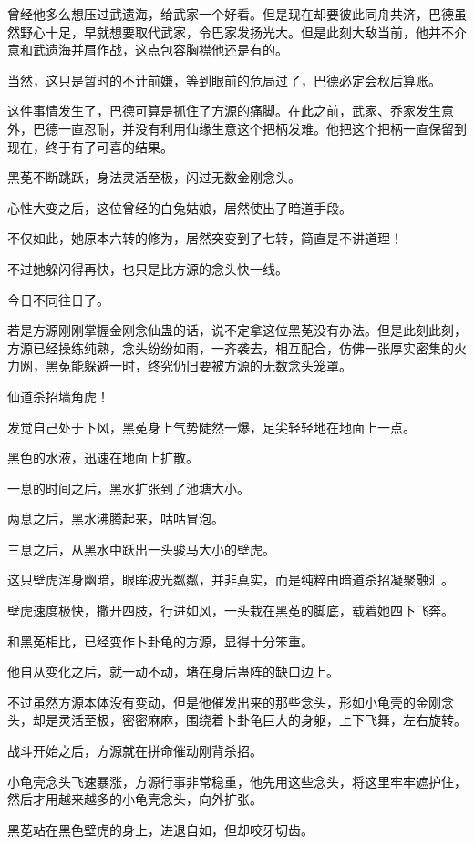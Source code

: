 \begin{this_body}
曾经他多么想压过武遗海，给武家一个好看。但是现在却要彼此同舟共济，巴德虽然野心十足，早就想要取代武家，令巴家发扬光大。但是此刻大敌当前，他并不介意和武遗海并肩作战，这点包容胸襟他还是有的。

当然，这只是暂时的不计前嫌，等到眼前的危局过了，巴德必定会秋后算账。

这件事情发生了，巴德可算是抓住了方源的痛脚。在此之前，武家、乔家发生意外，巴德一直忍耐，并没有利用仙缘生意这个把柄发难。他把这个把柄一直保留到现在，终于有了可喜的结果。

黑莬不断跳跃，身法灵活至极，闪过无数金刚念头。

心性大变之后，这位曾经的白兔姑娘，居然使出了暗道手段。

不仅如此，她原本六转的修为，居然突变到了七转，简直是不讲道理！

不过她躲闪得再快，也只是比方源的念头快一线。

今日不同往日了。

若是方源刚刚掌握金刚念仙蛊的话，说不定拿这位黑莬没有办法。但是此刻此刻，方源已经操练纯熟，念头纷纷如雨，一齐袭去，相互配合，仿佛一张厚实密集的火力网，黑莬能躲避一时，终究仍旧要被方源的无数念头笼罩。

仙道杀招墙角虎！

发觉自己处于下风，黑莬身上气势陡然一爆，足尖轻轻地在地面上一点。

黑色的水液，迅速在地面上扩散。

一息的时间之后，黑水扩张到了池塘大小。

两息之后，黑水沸腾起来，咕咕冒泡。

三息之后，从黑水中跃出一头骏马大小的壁虎。

这只壁虎浑身幽暗，眼眸波光粼粼，并非真实，而是纯粹由暗道杀招凝聚融汇。

壁虎速度极快，撒开四肢，行进如风，一头栽在黑莬的脚底，载着她四下飞奔。

和黑莬相比，已经变作卜卦龟的方源，显得十分笨重。

他自从变化之后，就一动不动，堵在身后蛊阵的缺口边上。

不过虽然方源本体没有变动，但是他催发出来的那些念头，形如小龟壳的金刚念头，却是灵活至极，密密麻麻，围绕着卜卦龟巨大的身躯，上下飞舞，左右旋转。

战斗开始之后，方源就在拼命催动刚背杀招。

小龟壳念头飞速暴涨，方源行事非常稳重，他先用这些念头，将这里牢牢遮护住，然后才用越来越多的小龟壳念头，向外扩张。

黑莬站在黑色壁虎的身上，进退自如，但却咬牙切齿。


\end{this_body}
